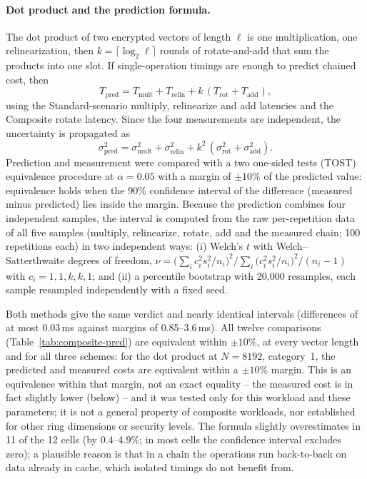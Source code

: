 \paragraph{Dot product and the prediction formula.} The dot product of two encrypted vectors of length $\ell$ is one multiplication, one relinearization, then $k = \lceil \log_2 \ell \rceil$ rounds of rotate-and-add that sum the products into one slot. If single-operation timings are enough to predict chained cost, then
\[
T_{\text{pred}} = T_{\text{mult}} + T_{\text{relin}} + k\,(T_{\text{rot}} + T_{\text{add}}),
\]
using the Standard-scenario multiply, relinearize and add latencies and the Composite rotate latency. Since the four measurements are independent, the uncertainty is propagated as
\[
\sigma^2_{\text{pred}} = \sigma^2_{\text{mult}} + \sigma^2_{\text{relin}} + k^2\,(\sigma^2_{\text{rot}} + \sigma^2_{\text{add}}).
\]
Prediction and measurement were compared with a two one-sided tests (TOST) equivalence procedure at $\alpha = 0.05$ with a margin of $\pm 10\%$ of the predicted value: equivalence holds when the 90\% confidence interval of the difference (measured minus predicted) lies inside the margin. Because the prediction combines four independent samples, the interval is computed from the raw per-repetition data of all five samples (multiply, relinearize, rotate, add and the measured chain; 100 repetitions each) in two independent ways: (i) Welch's $t$ with Welch--Satterthwaite degrees of freedom, $\nu = \big(\sum_i c_i^2 s_i^2/n_i\big)^2 / \sum_i \big(c_i^2 s_i^2/n_i\big)^2/(n_i-1)$ with $c_i = 1, 1, k, k, 1$; and (ii) a percentile bootstrap with 20{,}000 resamples, each sample resampled independently with a fixed seed.

\begin{table}[h!]
\centering\small
\resizebox{\textwidth}{!}{}
\caption{Predicted vs.\ measured dot-product latency, $N{=}8192$/category~1. ``Diff.'' is measured minus predicted; ``W--S df'' the Welch--Satterthwaite degrees of freedom; the 90\% intervals are those the TOST procedure uses, from each method. CKKS stops at length 4096, its slot count.}
\label{tab:composite-pred}
\end{table}

Both methods give the same verdict and nearly identical intervals (differences of at most 0.03\,ms against margins of 0.85--3.6\,ms). All twelve comparisons (Table~\ref{tab:composite-pred}) are equivalent within $\pm 10\%$, at every vector length and for all three schemes: for the dot product at $N{=}8192$, category~1, the predicted and measured costs are equivalent within a $\pm 10\%$ margin. This is an equivalence within that margin, not an exact equality -- the measured cost is in fact slightly lower (below) -- and it was tested only for this workload and these parameters; it is not a general property of composite workloads, nor established for other ring dimensions or security levels. The formula slightly overestimates in 11 of the 12 cells (by 0.4--4.9\%; in most cells the confidence interval excludes zero); a plausible reason is that in a chain the operations run back-to-back on data already in cache, which isolated timings do not benefit from.

